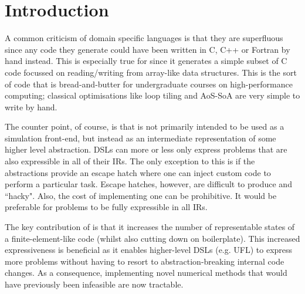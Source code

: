 \documentclass[thesis]{subfiles}
\begin{document}
\chapter{Introduction}
\label{chapter:introduction}


A common criticism of domain specific languages is that they are superfluous since any code they generate could have been written in C, C++ or Fortran by hand instead.
This is especially true for  since it generates a simple subset of C code focussed on reading/writing from array-like data structures.
This is the sort of code that is bread-and-butter for undergraduate courses on high-performance computing; classical optimisations like loop tiling and AoS-SoA are very simple to write by hand.

The counter point, of course, is that  is not primarily intended to be used as a simulation front-end, but instead as an intermediate representation of some higher level abstraction.
DSLs can more or less only express problems that are also expressible in all of their IRs.
The only exception to this is if the abstractions provide an escape hatch where one can inject custom code to perform a particular task.
Escape hatches, however, are difficult to produce and ``hacky".
Also, the cost of implementing one can be prohibitive.
It would be preferable for problems to be fully expressible in all IRs.

The key contribution of  is that it increases the number of representable states of a finite-element-like code (whilst also cutting down on boilerplate).
This increased expressiveness is beneficial as it enables higher-level DSLs (e.g. UFL) to express more problems without having to resort to abstraction-breaking internal code changes.
As a consequence, implementing novel numerical methods that would have previously been infeasible are now tractable.




\end{document}
